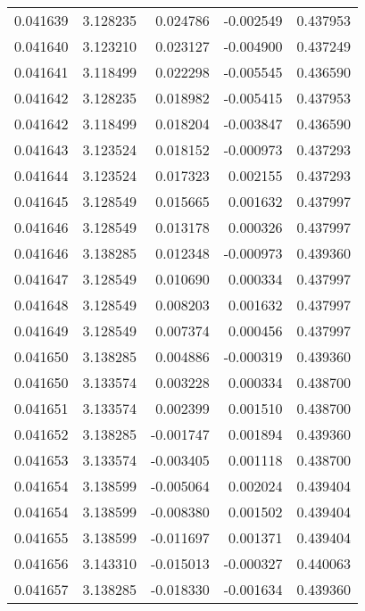 \begin{tabular}{lrrrr}
0.041639    &  3.128235 &  0.024786 & -0.002549 &             0.437953 \\
0.041640    &  3.123210 &  0.023127 & -0.004900 &             0.437249 \\
0.041641    &  3.118499 &  0.022298 & -0.005545 &             0.436590 \\
0.041642    &  3.128235 &  0.018982 & -0.005415 &             0.437953 \\
0.041642    &  3.118499 &  0.018204 & -0.003847 &             0.436590 \\
0.041643    &  3.123524 &  0.018152 & -0.000973 &             0.437293 \\
0.041644    &  3.123524 &  0.017323 &  0.002155 &             0.437293 \\
0.041645    &  3.128549 &  0.015665 &  0.001632 &             0.437997 \\
0.041646    &  3.128549 &  0.013178 &  0.000326 &             0.437997 \\
0.041646    &  3.138285 &  0.012348 & -0.000973 &             0.439360 \\
0.041647    &  3.128549 &  0.010690 &  0.000334 &             0.437997 \\
0.041648    &  3.128549 &  0.008203 &  0.001632 &             0.437997 \\
0.041649    &  3.128549 &  0.007374 &  0.000456 &             0.437997 \\
0.041650    &  3.138285 &  0.004886 & -0.000319 &             0.439360 \\
0.041650    &  3.133574 &  0.003228 &  0.000334 &             0.438700 \\
0.041651    &  3.133574 &  0.002399 &  0.001510 &             0.438700 \\
0.041652    &  3.138285 & -0.001747 &  0.001894 &             0.439360 \\
0.041653    &  3.133574 & -0.003405 &  0.001118 &             0.438700 \\
0.041654    &  3.138599 & -0.005064 &  0.002024 &             0.439404 \\
0.041654    &  3.138599 & -0.008380 &  0.001502 &             0.439404 \\
0.041655    &  3.138599 & -0.011697 &  0.001371 &             0.439404 \\
0.041656    &  3.143310 & -0.015013 & -0.000327 &             0.440063 \\
0.041657    &  3.138285 & -0.018330 & -0.001634 &             0.439360 \\

\end{tabular}
